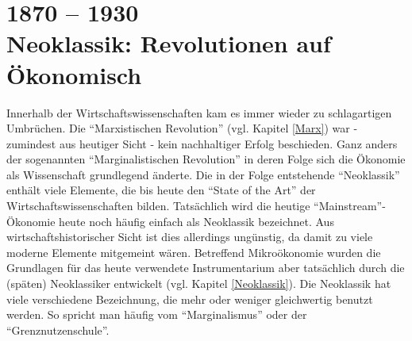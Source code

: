 %
%
%


\part{1870 -- 1930\\Neoklassik: Revolutionen auf Ökonomisch}

Innerhalb der Wirtschaftswissenschaften kam es immer wieder zu schlagartigen Umbrüchen. Die "`Marxistischen Revolution"' (vgl. Kapitel \ref{Marx}) war - zumindest aus heutiger Sicht - kein nachhaltiger Erfolg beschieden. Ganz anders der sogenannten "`Marginalistischen Revolution"' in deren Folge sich die Ökonomie als Wissenschaft grundlegend änderte. Die in der Folge entstehende "`Neoklassik"' enthält viele Elemente, die bis heute den "`State of the Art"' der Wirtschaftswissenschaften bilden. Tatsächlich wird die heutige "`Mainstream"'-Ökonomie heute noch häufig einfach als Neoklassik bezeichnet. Aus wirtschaftshistorischer Sicht ist dies allerdings ungünstig, da damit zu viele moderne Elemente mitgemeint wären. Betreffend Mikroökonomie wurden die Grundlagen für das heute verwendete Instrumentarium aber tatsächlich durch die (späten) Neoklassiker entwickelt (vgl. Kapitel \ref{Neoklassik}). Die Neoklassik hat viele verschiedene Bezeichnung, die mehr oder weniger gleichwertig benutzt werden. So spricht man häufig vom "`Marginalismus"' oder der "`Grenznutzenschule"'.

